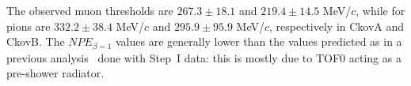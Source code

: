 The observed muon thresholds are $267.3\pm18.1$ and $219.4\pm14.5$ MeV/$c$, while for pions are $332.2\pm38.4$ MeV/$c$ and $295.9\pm95.9$ MeV/$c$, respectively in CkovA and CkovB. The $NPE_{\beta=1}$ values are generally lower than the values predicted as in a previous analysis~\cite{NOTE473} done with Step~I data: this is mostly due to TOF0 acting as a pre-shower radiator.



